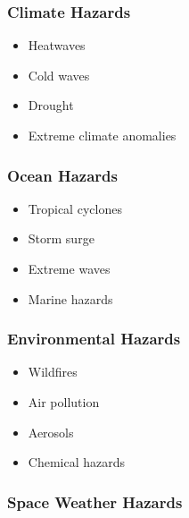 \subsubsection{Climate Hazards}

\begin{itemize}

\item Heatwaves

\item Cold waves

\item Drought

\item Extreme climate anomalies

\end{itemize}


\subsubsection{Ocean Hazards}

\begin{itemize}

\item Tropical cyclones

\item Storm surge

\item Extreme waves

\item Marine hazards

\end{itemize}


\subsubsection{Environmental Hazards}

\begin{itemize}

\item Wildfires

\item Air pollution

\item Aerosols

\item Chemical hazards

\end{itemize}


\subsubsection{Space Weather Hazards}

